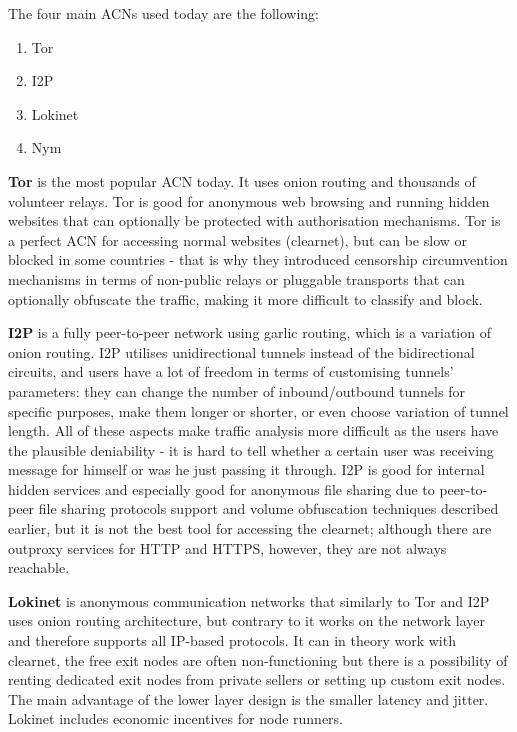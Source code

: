 The four main ACNs used today are the following:
\begin{enumerate}
    \item Tor
    \item I2P
    \item Lokinet
    \item Nym
\end{enumerate}

\textbf{Tor} is the most popular ACN today. It uses onion routing and thousands of volunteer relays. Tor is good for anonymous web browsing and running hidden websites that can optionally be protected with authorisation mechanisms. Tor is a perfect ACN for accessing normal websites (clearnet), but can be slow or blocked in some countries - that is why they introduced censorship circumvention mechanisms in terms of non-public relays or pluggable transports that can optionally obfuscate the traffic, making it more difficult to classify and block.

\textbf{I2P} is a fully peer-to-peer network using garlic routing, which is a variation of onion routing. I2P utilises unidirectional tunnels instead of the bidirectional circuits, and users have a lot of freedom in terms of customising tunnels' parameters: they can change the number of inbound/outbound tunnels for specific purposes, make them longer or shorter, or even choose variation of tunnel length. All of these aspects make traffic analysis more difficult as the users have the plausible deniability - it is hard to tell whether a certain user was receiving message for himself or was he just passing it through. I2P is good for internal hidden services and especially good for anonymous file sharing due to peer-to-peer file sharing protocols support and volume obfuscation techniques described earlier, but it is not the best tool for accessing the clearnet; although there are outproxy services for HTTP and HTTPS, however, they are not always reachable.

\textbf{Lokinet} is anonymous communication networks that similarly to Tor and I2P uses onion routing architecture, but contrary to it works on the network layer and therefore supports all IP-based protocols. It can in theory work with clearnet, the free exit nodes are often non-functioning but there is a possibility of renting dedicated exit nodes from private sellers or setting up custom exit nodes. The main advantage of the lower layer design is the smaller latency and jitter. Lokinet includes economic incentives for node runners.

